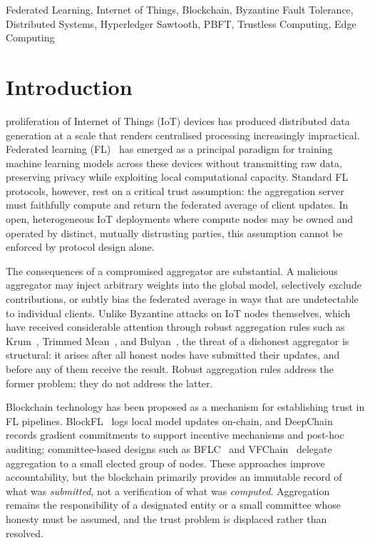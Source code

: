 \documentclass[lettersize,journal]{IEEEtran}
\begin{document}
\begin{IEEEkeywords}
Federated Learning, Internet of Things, Blockchain, Byzantine Fault Tolerance,
Distributed Systems, Hyperledger Sawtooth, PBFT, Trustless Computing, Edge Computing
\end{IEEEkeywords}

\section{Introduction}
\label{sec:intro}

 proliferation of Internet of Things (IoT) devices has produced
distributed data generation at a scale that renders centralised processing increasingly
impractical. Federated learning (FL)~\cite{mcmahan2017communication} has emerged as a
principal paradigm for training machine learning models across these devices without
transmitting raw data, preserving privacy while exploiting local computational capacity.
Standard FL protocols, however, rest on a critical trust assumption: the aggregation server
must faithfully compute and return the federated average of client updates. In open,
heterogeneous IoT deployments where compute nodes may be owned and operated by distinct,
mutually distrusting parties, this assumption cannot be enforced by protocol design alone.

The consequences of a compromised aggregator are substantial. A malicious aggregator may
inject arbitrary weights into the global model, selectively exclude contributions, or
subtly bias the federated average in ways that are undetectable to individual clients.
Unlike Byzantine attacks on IoT nodes themselves, which have received considerable attention
through robust aggregation rules such as Krum~\cite{blanchard2017machine}, Trimmed
Mean~\cite{yin2018byzantine}, and Bulyan~\cite{elMhamdi2018hidden}, the threat of a
dishonest aggregator is structural: it arises after all honest nodes have submitted their
updates, and before any of them receive the result. Robust aggregation rules address the
former problem; they do not address the latter.

Blockchain technology has been proposed as a mechanism for establishing trust in FL
pipelines. BlockFL~\cite{kim2020blockchained} logs local model updates on-chain, and
DeepChain~\cite{weng2021deepchain} records gradient commitments to support incentive
mechanisms and post-hoc auditing; committee-based designs such as BFLC~\cite{li2021bflc}
and VFChain~\cite{peng2022vfchain} delegate aggregation to a small elected group of
nodes. These approaches improve accountability, but the blockchain primarily provides an
immutable record of what was \emph{submitted}, not a verification of what was
\emph{computed}. Aggregation remains the responsibility of a designated entity or a
small committee whose honesty must be assumed, and the trust problem is displaced rather
than resolved.
\end{document}
